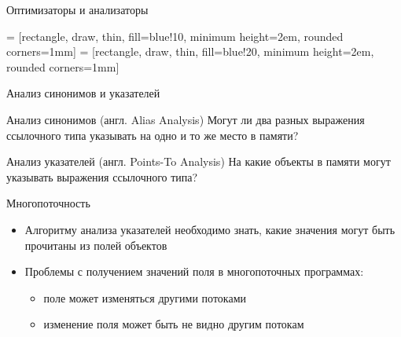 \documentclass[usenames,dvipsnames,pdftex,unicode]{beamer}
\newcommand{\eng}[1]{{\English#1}}
\begin{document}
\begin{frame}{Оптимизаторы и анализаторы}

   = [rectangle, draw, thin, fill=blue!10,%
                         minimum height=2em, rounded corners=1mm]
   =  [rectangle, draw, thin, fill=blue!20,%
                         minimum height=2em, rounded corners=1mm]

  \begin{figure}
  \end{figure}

\end{frame}

\begin{frame}{Анализ синонимов и указателей}

  \begin{block}{Анализ синонимов (англ. \eng{Alias Analysis})}
    Могут ли два разных выражения ссылочного типа указывать на одно и то же
    место в памяти?
  \end{block}

  \begin{block}{Анализ указателей (англ. \eng{Points-To Analysis})}
    На какие объекты в памяти могут указывать выражения ссылочного типа?
  \end{block}

\end{frame}

\begin{frame}{Многопоточность}

  \begin{itemize}
    \item<1-> Алгоритму анализа указателей необходимо знать, какие значения
          могут быть прочитаны из полей объектов
    \item<1-> Проблемы с получением значений поля в многопоточных программах:
          \begin{itemize}
            \item<2-> поле может изменяться другими потоками
            \item<3-> изменение поля может быть не видно другим потокам
          \end{itemize}
  \end{itemize}

\end{frame}
\end{document}
